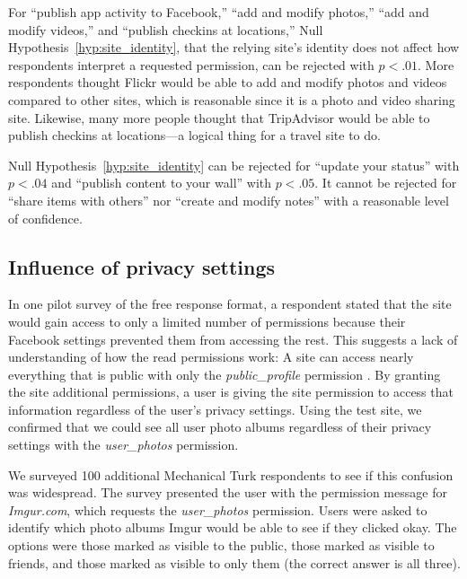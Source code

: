 \documentclass{sig-alternate}
\newcommand{\extendedversion}[2]{#2}
\begin{document}
For ``publish app activity to Facebook,'' ``add and modify photos,'' ``add and modify videos,'' and ``publish checkins at locations,'' Null Hypothesis~\ref{hyp:site_identity}, that the relying site's identity does not affect how respondents interpret a requested permission, can be rejected with $p < .01$. More respondents thought Flickr would be able to add and modify photos and videos compared to other sites, which is reasonable since it is a photo and video sharing site. Likewise, many more people thought that TripAdvisor would be able to publish checkins at locations---a logical thing for a travel site to do.

Null Hypothesis~\ref{hyp:site_identity} can be rejected for ``update your status'' with $p < .04$ and ``publish content to your wall'' with $p < .05$. It cannot be rejected for ``share items with others'' nor ``create and modify notes'' with a reasonable level of confidence.



\subsection{Influence of privacy settings}
\label{sec:privacysurvey}

In one pilot survey of the free response format, a respondent stated that the site would gain access to only a limited number of permissions because their Facebook settings prevented them from accessing the rest. This suggests a lack of understanding of how the read permissions work: A site can access nearly everything that is public with only the \emph{public\_profile} permission \cite{fbprivacyfaq}. By granting the site additional permissions, a user is giving the site permission to access that information regardless of the user's privacy settings. Using the test site, we confirmed that we could see all user photo albums regardless of their privacy settings with the \emph{user\_photos} permission.

We surveyed 100 additional Mechanical Turk respondents to see if this confusion was widespread. The survey presented the user with the permission message for \emph{Imgur.com}, which requests the \emph{user\_photos} permission. Users were asked to identify which photo albums Imgur would be able to see if they clicked okay. The options were those marked as visible to the public, those marked as visible to friends, and those marked as visible to only them (the correct answer is all three). \extendedversion{The survey can be seen in Appendix~\ref{appendix:readsurvey2}.}{}
\end{document}
